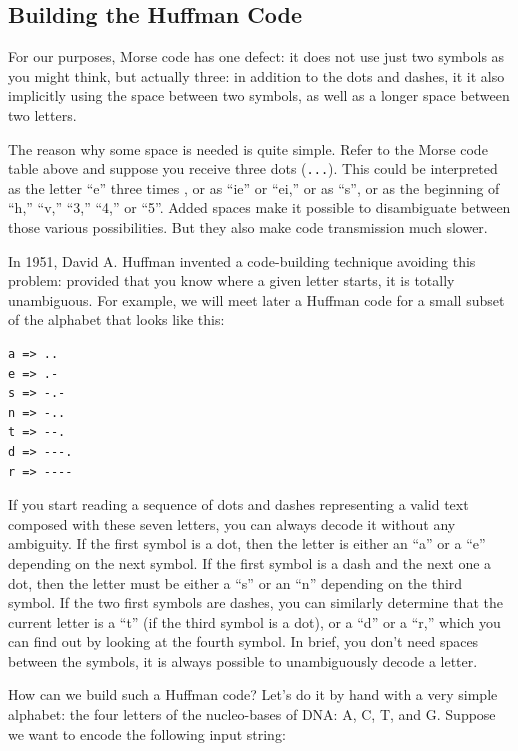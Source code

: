 \subsection{Building the Huffman Code}

For our purposes, Morse code has one defect: it does not 
use just two symbols as you might think, but actually three: 
in addition to the dots and dashes, it it also implicitly 
using the space between two symbols, as well as a longer space 
between two letters.

The reason why some space is needed is quite simple. Refer to the Morse 
code table above and suppose you receive three dots (\verb'...'). 
This could be interpreted as the letter ``e'' three times , or as 
``ie'' or ``ei,'' or as ``s'', or as the beginning of ``h,'' ``v,'' 
``3,'' ``4,'' or ``5''. Added spaces make it possible to disambiguate 
between those various possibilities. But they also make code 
transmission much slower.

In 1951, David A. Huffman invented a code-building technique avoiding 
this problem: provided that you know where a given letter starts, 
it is totally unambiguous. For example, we will meet later a Huffman 
code for a small subset of the alphabet that looks like this:

\begin{verbatim}
a => ..
e => .-
s => -.-
n => -..
t => --.
d => ---.
r => ----
\end{verbatim}

If you start reading a sequence of dots and dashes representing a 
valid text composed with these seven letters, you can always decode 
it without any ambiguity. If the first symbol is a dot, then the letter 
is either an ``a'' or a ``e'' depending on the next symbol. If the 
first symbol is a dash and the next one a dot, then the letter must 
be either a ``s'' or an ``n'' depending on the third symbol. If the 
two first symbols are dashes, you can similarly determine that the 
current letter is a ``t'' (if the third symbol is a dot), or a ``d'' 
or a ``r,'' which you can find out by looking at the fourth symbol. 
In brief, you don't need spaces between the symbols, it is always 
possible to unambiguously decode a letter.

How can we build such a Huffman code? Let's do it by hand with a 
very simple alphabet: the four letters of the nucleo-bases of DNA: A, 
C, T, and G. Suppose we want to encode the following input string:

